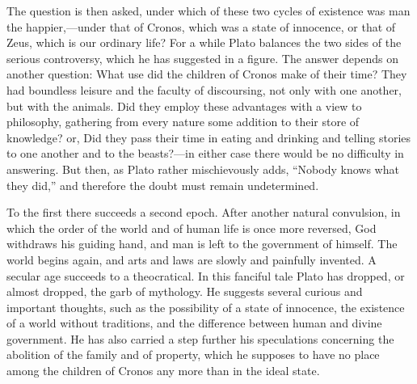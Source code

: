 \documentclass[11pt,letter]{article}
\begin{document}
\par  The question is then asked, under which of these two cycles of existence was man the happier,—under that of Cronos, which was a state of innocence, or that of Zeus, which is our ordinary life? For a while Plato balances the two sides of the serious controversy, which he has suggested in a figure. The answer depends on another question: What use did the children of Cronos make of their time? They had boundless leisure and the faculty of discoursing, not only with one another, but with the animals. Did they employ these advantages with a view to philosophy, gathering from every nature some addition to their store of knowledge? or, Did they pass their time in eating and drinking and telling stories to one another and to the beasts?—in either case there would be no difficulty in answering. But then, as Plato rather mischievously adds, “Nobody knows what they did,” and therefore the doubt must remain undetermined.

\par  To the first there succeeds a second epoch. After another natural convulsion, in which the order of the world and of human life is once more reversed, God withdraws his guiding hand, and man is left to the government of himself. The world begins again, and arts and laws are slowly and painfully invented. A secular age succeeds to a theocratical. In this fanciful tale Plato has dropped, or almost dropped, the garb of mythology. He suggests several curious and important thoughts, such as the possibility of a state of innocence, the existence of a world without traditions, and the difference between human and divine government. He has also carried a step further his speculations concerning the abolition of the family and of property, which he supposes to have no place among the children of Cronos any more than in the ideal state.
\end{document}
